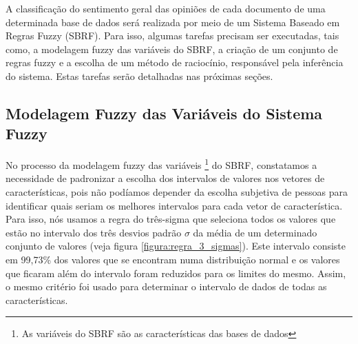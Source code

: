 
A classificação do sentimento geral das opiniões de cada documento de uma determinada base de dados será realizada por meio de um Sistema Baseado em Regras Fuzzy (SBRF). Para isso, algumas tarefas precisam ser executadas, tais como, a modelagem fuzzy das variáveis do SBRF, a criação de um conjunto de regras fuzzy e a escolha de um método de raciocínio, responsável pela inferência do sistema. Estas tarefas serão detalhadas nas próximas seções.

\subsection{Modelagem Fuzzy das Variáveis do Sistema Fuzzy}

No processo da modelagem fuzzy das variáveis \footnote{As variáveis do SBRF são as características das bases de dados} do SBRF, constatamos a necessidade de padronizar a escolha dos intervalos de valores nos vetores de características, pois não podíamos depender da escolha subjetiva de pessoas para identificar quais seriam os melhores intervalos para cada vetor de característica.  Para isso, nós usamos a regra do três-sigma \cite{kazmier2004schaum} que seleciona todos os valores que estão no intervalo dos três desvios padrão $\sigma$ da média de um determinado conjunto de valores (veja figura \ref{figura:regra_3_sigmas}). Este intervalo consiste em 99,73\% dos valores que se encontram numa distribuição normal e os valores que ficaram além do intervalo foram reduzidos para os limites do mesmo. Assim, o mesmo critério foi usado para determinar o intervalo de dados de todas as características. 


